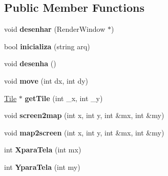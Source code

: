 \subsection*{Public Member Functions}
\begin{DoxyCompactItemize}
\item 
\hypertarget{class_edda_1_1_tilemap_a76524bc24f1ad9910410dec817ed3cbf}{
void {\bfseries desenhar} (RenderWindow $\ast$)}
\label{class_edda_1_1_tilemap_a76524bc24f1ad9910410dec817ed3cbf}

\item 
\hypertarget{class_edda_1_1_tilemap_a5acc405b96a2a9930a83e25f2bae739c}{
bool {\bfseries inicializa} (string arq)}
\label{class_edda_1_1_tilemap_a5acc405b96a2a9930a83e25f2bae739c}

\item 
\hypertarget{class_edda_1_1_tilemap_a05c8b0069bd66eeea1b9af9f04408063}{
void {\bfseries desenha} ()}
\label{class_edda_1_1_tilemap_a05c8b0069bd66eeea1b9af9f04408063}

\item 
\hypertarget{class_edda_1_1_tilemap_a84a6adb25af48e068ab107c5ac2be556}{
void {\bfseries move} (int dx, int dy)}
\label{class_edda_1_1_tilemap_a84a6adb25af48e068ab107c5ac2be556}

\item 
\hypertarget{class_edda_1_1_tilemap_a184b5c5a773673514f7a71556ae757a0}{
\hyperlink{class_edda_1_1_tile}{Tile} $\ast$ {\bfseries getTile} (int \_\-x, int \_\-y)}
\label{class_edda_1_1_tilemap_a184b5c5a773673514f7a71556ae757a0}

\item 
\hypertarget{class_edda_1_1_tilemap_a137da551ada18de39eed323b3ec17363}{
void {\bfseries screen2map} (int x, int y, int \&mx, int \&my)}
\label{class_edda_1_1_tilemap_a137da551ada18de39eed323b3ec17363}

\item 
\hypertarget{class_edda_1_1_tilemap_adcfe41aafcd25aef74d3caa29f1faf5b}{
void {\bfseries map2screen} (int x, int y, int \&mx, int \&my)}
\label{class_edda_1_1_tilemap_adcfe41aafcd25aef74d3caa29f1faf5b}

\item 
\hypertarget{class_edda_1_1_tilemap_a5e8ca0394395e9f9edf0406ffc8301b6}{
int {\bfseries XparaTela} (int mx)}
\label{class_edda_1_1_tilemap_a5e8ca0394395e9f9edf0406ffc8301b6}

\item 
\hypertarget{class_edda_1_1_tilemap_a5844165095af2ef3c19e812cb65f43c7}{
int {\bfseries YparaTela} (int my)}
\label{class_edda_1_1_tilemap_a5844165095af2ef3c19e812cb65f43c7}


\end{DoxyCompactItemize}
